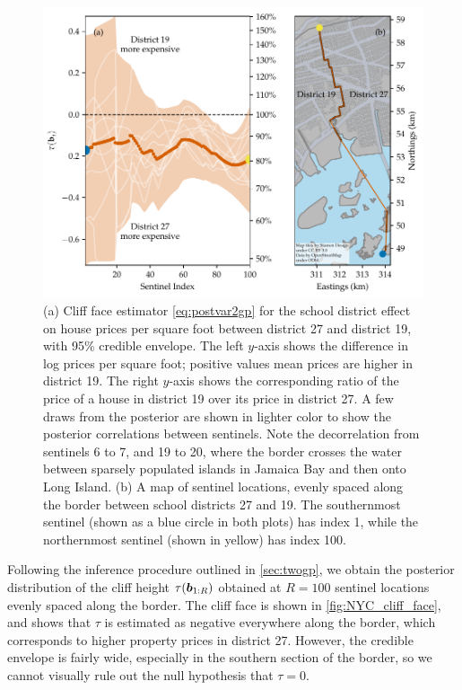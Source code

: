 \begin{figure}[tb]
    \centering
    \includegraphics[height=0.35\textheight]{../NYC/NYC_plots/NYC_cliff_face.pdf}
    \caption{\label{fig:NYC_cliff_face}
        (a)
        Cliff face estimator \autoref{eq:postvar2gp} for the school district effect on house prices per square foot between district 27 and district 19, with 95\% credible envelope.
        The left \(y\)-axis shows the difference in log prices per square foot; positive values mean prices are higher in district 19.
        The right \(y\)-axis shows the corresponding ratio of the price of a house in district 19 over its price in district 27.
        A few draws from the posterior are shown in lighter color to show the posterior correlations between sentinels.
        Note the decorrelation from sentinels 6 to 7, and 19 to 20, where the border crosses the water between sparsely populated islands in Jamaica Bay and then onto Long Island.
        (b)
        A map of sentinel locations, evenly spaced along the border between school districts 27 and 19.
    	The southernmost sentinel (shown as a blue circle in both plots) has index 1, while the northernmost sentinel (shown in yellow) has index 100.
	}
\end{figure}

Following the inference procedure outlined in \autoref{sec:twogp}, we obtain the posterior distribution of the cliff height \(\tau(\bm{b}_{1:R})\) obtained at \(R=100\) sentinel locations evenly spaced along the border.
The cliff face is shown in \autoref{fig:NYC_cliff_face}, and shows that \(\tau\) is estimated as negative everywhere along the border, which corresponds to higher property prices in district 27.
However, the credible envelope is fairly wide, especially in the southern section of the border, so we cannot visually rule out the null hypothesis that \(\tau=0\).

